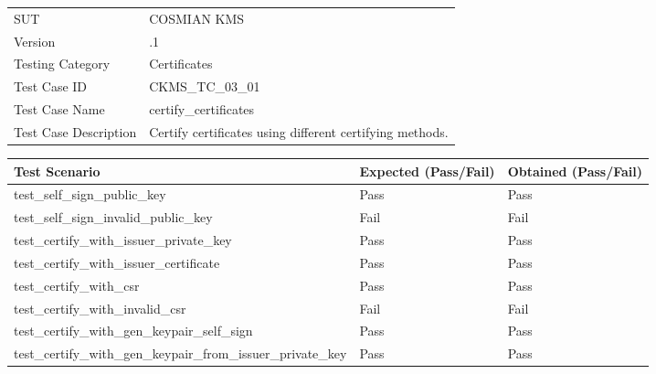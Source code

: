 \documentclass[a4paper,12pt]{article}
\begin{document}
\begin{table}[h]
    \centering
    \begin{tabularx}{1\textwidth}{ 
      | >{\raggedright\arraybackslash}X 
      | >{\raggedright\arraybackslash}X | }
        \hline
        \rowcolor{grey!15}
        \multicolumn{2}{|c|}{\textbf{Software Information}} \\  %
        \hline
        SUT & COSMIAN KMS \\
        \hline
        Version & 4.19.1 \\
        \hline
        Testing Category & Certificates \\
        \hline
        Test Case ID & CKMS\_TC\_03\_01 \\
        \hline
        Test Case Name & certify\_certificates \\
        \hline
        Test Case Description & Certify certificates using different certifying methods. \\
        \hline
    \end{tabularx}
\end{table}

\begin{table}[h]
    \centering
    \begin{tabularx}{1\textwidth}{ 
      | >{\raggedright\arraybackslash}X   
      | p{2.5cm}                            
      | p{2.5cm} |}                         
        \hline
        \textbf{Test Scenario} & \textbf{Expected (Pass/Fail)} & \textbf{Obtained (Pass/Fail)} \\  
        \hline

test\_self\_sign\_public\_key & Pass & Pass \\
\hline

test\_self\_sign\_invalid\_public\_key & Fail & Fail \\
\hline

test\_certify\_with\_issuer\_private\_key & Pass & Pass \\
\hline

test\_certify\_with\_issuer\_certificate & Pass & Pass \\
\hline

test\_certify\_with\_csr & Pass & Pass \\
\hline

test\_certify\_with\_invalid\_csr & Fail & Fail \\
\hline

test\_certify\_with\_gen\_keypair\_self\_sign & Pass & Pass \\
\hline

test\_certify\_with\_gen\_keypair\_from\_issuer\_private\_key & Pass & Pass \\
\hline

    \end{tabularx}
\end{table}
\end{document}
